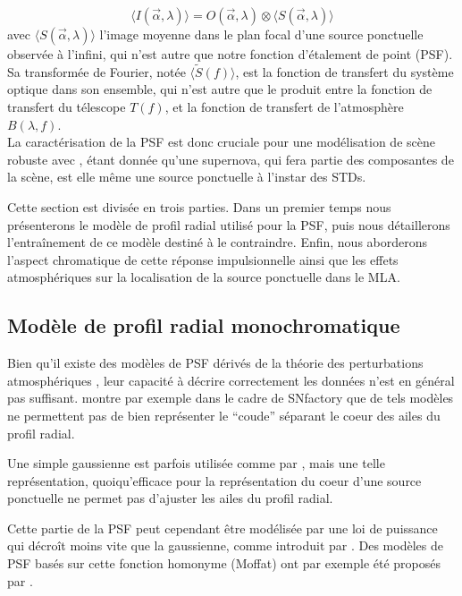 \documentclass[../main/main.tex]{subfiles}
\begin{document}
\begin{equation}
  \label{eq:transfertpsf}
  \langle I(\vec{\alpha},\lambda)\rangle = O(\vec{\alpha},\lambda) \otimes \langle
  S(\vec{\alpha}, \lambda)\rangle
\end{equation}
avec $\langle S(\vec{\alpha}, \lambda)\rangle$ l'image moyenne dans le plan focal d'une
source ponctuelle observée à l'infini, qui n'est autre que notre
fonction d'étalement de point (PSF). Sa transformée de Fourier, notée
$\langle \widetilde{S}(f)\rangle$, est la fonction
de transfert du système optique dans son ensemble, qui n'est autre que
le produit entre la fonction de transfert du télescope
$T(f)$, et la fonction de transfert de l'atmosphère $B(\lambda, f)$.\\

La caractérisation de la PSF est donc cruciale pour une
modélisation de scène robuste avec \hypergal, étant donnée qu'une
supernova, qui fera partie des composantes de la scène, est elle
même une source ponctuelle à l'instar des STDs.

Cette section est divisée en trois parties. Dans un premier temps nous
présenterons le modèle de profil radial utilisé pour la PSF, puis nous
détaillerons l'entraînement de ce modèle destiné à le contraindre. Enfin,
nous aborderons l'aspect chromatique de cette réponse
impulsionnelle ainsi que les effets atmosphériques sur la localisation de la
source ponctuelle dans le MLA.


\subsection{Modèle de profil radial monochromatique}\label{ssec:radialpsf}

Bien qu'il existe des modèles de PSF dérivés de la théorie des
perturbations atmosphériques \citep{Kolmogorov, Fried1966,Tokovinin},
leur capacité à décrire correctement les données n'est en général pas
suffisant. \citet{Butonthese} montre par exemple dans le cadre de
SNfactory que de tels modèles ne
permettent pas de bien représenter le ``coude'' séparant le coeur des ailes du profil radial.

Une simple gaussienne est parfois utilisée comme par \citet{King1971},
mais une telle représentation, quoiqu'efficace pour la représentation du
coeur d'une source ponctuelle ne permet pas d'ajuster les ailes du
profil radial.

Cette partie de la PSF peut cependant être modélisée par une
loi de puissance qui décroît moins vite que la gaussienne, comme
introduit par \citet{Moffat1969}. Des modèles de PSF basés sur cette
fonction homonyme (Moffat) ont par exemple été proposés par
\citet{Racine1996, Trujillo2001}.
\end{document}
